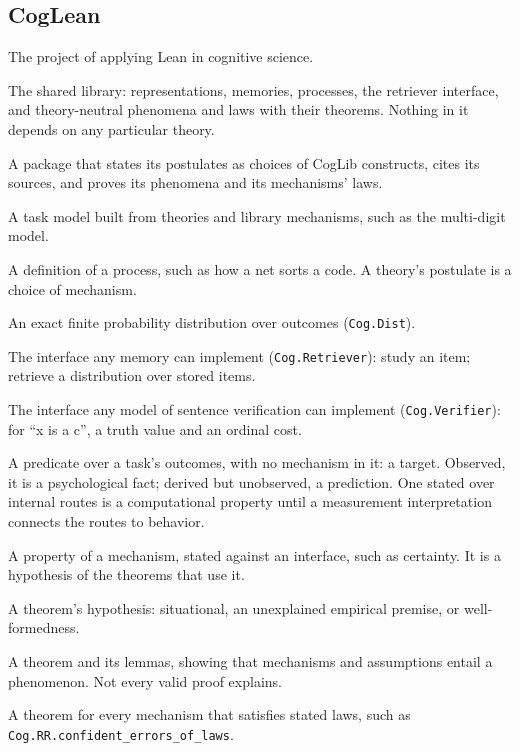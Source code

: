 \documentclass[11pt]{article}
\newcommand{\lean}[1]{\texttt{#1}}
\begin{document}
\subsection*{CogLean}
\begin{description}[leftmargin=1em,itemsep=1pt,font=\normalfont\itshape]
\item[CogLean.] The project of applying Lean in cognitive science.
\item[CogLib.] The shared library: representations, memories, processes, the retriever interface, and theory-neutral phenomena and laws with their theorems. Nothing in it depends on any particular theory.
\item[Theory.] A package that states its postulates as choices of CogLib constructs, cites its sources, and proves its phenomena and its mechanisms' laws.
\item[Application.] A task model built from theories and library mechanisms, such as the multi-digit model.
\item[Mechanism.] A definition of a process, such as how a net sorts a code. A theory's postulate is a choice of mechanism.
\item[Distribution.] An exact finite probability distribution over outcomes (\lean{Cog.Dist}).
\item[Retriever.] The interface any memory can implement (\lean{Cog.Retriever}): study an item; retrieve a distribution over stored items.
\item[Verifier.] The interface any model of sentence verification can implement (\lean{Cog.Verifier}): for ``x is a c'', a truth value and an ordinal cost.
\item[Phenomenon.] A predicate over a task's outcomes, with no mechanism in it: a target. Observed, it is a psychological fact; derived but unobserved, a prediction. One stated over internal routes is a computational property until a measurement interpretation connects the routes to behavior.
\item[Law.] A property of a mechanism, stated against an interface, such as certainty. It is a hypothesis of the theorems that use it.
\item[Condition.] A theorem's hypothesis: situational, an unexplained empirical premise, or well-formedness.
\item[Explanation.] A theorem and its lemmas, showing that mechanisms and assumptions entail a phenomenon. Not every valid proof explains.
\item[Class theorem.] A theorem for every mechanism that satisfies stated laws, such as \lean{Cog.RR.confident\_errors\_of\_laws}.

\end{description}
\end{document}
